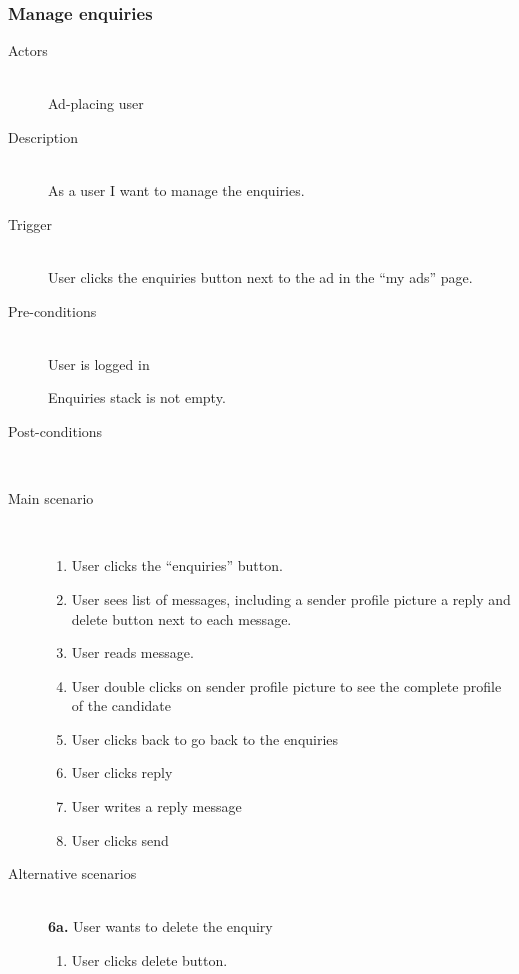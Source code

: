 \documentclass[a4wide]{article}
\begin{document}
\subsubsection{Manage enquiries}
\begin{description}
\item[Actors]\mbox{}\\
Ad-placing user

\item[Description]\mbox{}\\
As a user I want to manage the enquiries.
\item[Trigger]\mbox{}\\
User clicks the enquiries button next to the ad in the “my ads” page.
\item[Pre-conditions]\mbox{}\\
User is logged in

Enquiries stack is not empty.

\item[Post-conditions]\mbox{}\\
\item[Main scenario]\mbox{}\\
\begin{enumerate}
\item User clicks the “enquiries” button.
\item User sees list of messages, including a sender profile picture a reply and delete button next to each message.
\item User reads message.
\item User double clicks on sender profile picture to see the complete profile of the candidate
\item User clicks back to go back to the enquiries 
\item User clicks reply
\item User writes a reply message
\item User clicks send
\end{enumerate}
\item[Alternative scenarios]\mbox{}\\
\textbf{6a.} User wants to delete the enquiry
\begin{enumerate}
\item User clicks delete button.
\end{enumerate}
\end{description}
\end{document}
